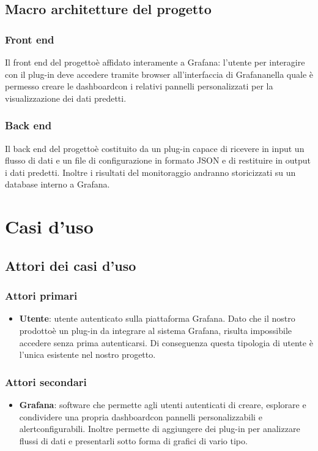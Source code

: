 	\subsection{Macro architetture del progetto}
		\subsubsection{Front end}
		Il front end del progetto\glosp è affidato interamente a Grafana\glo: l'utente per interagire con il plug-in deve accedere tramite browser all'interfaccia di Grafana\glosp nella quale è permesso creare le dashboard\glosp con i relativi pannelli personalizzati per la visualizzazione dei dati predetti. 
		\subsubsection{Back end}
		Il back end del progetto\glosp è costituito da un plug-in capace di ricevere in input un flusso di dati e un file di configurazione in formato JSON e di restituire in output i dati predetti. Inoltre i risultati del monitoraggio andranno storicizzati su un database interno a Grafana\glo.
\section{Casi d'uso}
	\subsection{Attori dei casi d'uso}
		\subsubsection{Attori primari}
		\begin{itemize}
			\item \textbf{Utente}: utente autenticato sulla piattaforma Grafana\glo. Dato che il nostro prodotto\glosp è un plug-in da integrare al sistema Grafana\glo, risulta impossibile accedere senza prima autenticarsi. Di conseguenza questa tipologia di utente è l'unica esistente nel nostro progetto\glo.
		\end{itemize}
		\subsubsection{Attori secondari}
		\begin{itemize}
			\item \textbf{Grafana}\glo: software che permette agli utenti autenticati di creare, esplorare e condividere una propria dashboard\glosp con pannelli personalizzabili e alert\glosp configurabili. Inoltre permette di aggiungere dei plug-in per analizzare flussi di dati e presentarli sotto forma di grafici di vario tipo.
		\end{itemize}
